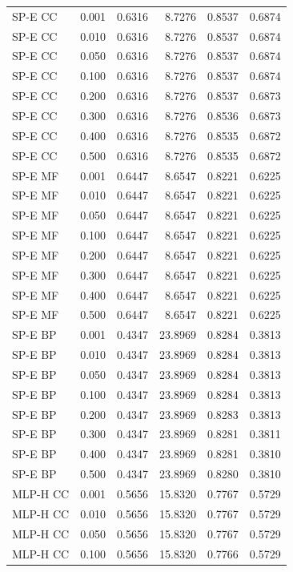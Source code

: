 \begin{longtable}{lrrrrr}
SP-E CC & 0.001 & 0.6316 & 8.7276 & 0.8537 & 0.6874 \\
SP-E CC & 0.010 & 0.6316 & 8.7276 & 0.8537 & 0.6874 \\
SP-E CC & 0.050 & 0.6316 & 8.7276 & 0.8537 & 0.6874 \\
SP-E CC & 0.100 & 0.6316 & 8.7276 & 0.8537 & 0.6874 \\
SP-E CC & 0.200 & 0.6316 & 8.7276 & 0.8537 & 0.6873 \\
SP-E CC & 0.300 & 0.6316 & 8.7276 & 0.8536 & 0.6873 \\
SP-E CC & 0.400 & 0.6316 & 8.7276 & 0.8535 & 0.6872 \\
SP-E CC & 0.500 & 0.6316 & 8.7276 & 0.8535 & 0.6872 \\
SP-E MF & 0.001 & 0.6447 & 8.6547 & 0.8221 & 0.6225 \\
SP-E MF & 0.010 & 0.6447 & 8.6547 & 0.8221 & 0.6225 \\
SP-E MF & 0.050 & 0.6447 & 8.6547 & 0.8221 & 0.6225 \\
SP-E MF & 0.100 & 0.6447 & 8.6547 & 0.8221 & 0.6225 \\
SP-E MF & 0.200 & 0.6447 & 8.6547 & 0.8221 & 0.6225 \\
SP-E MF & 0.300 & 0.6447 & 8.6547 & 0.8221 & 0.6225 \\
SP-E MF & 0.400 & 0.6447 & 8.6547 & 0.8221 & 0.6225 \\
SP-E MF & 0.500 & 0.6447 & 8.6547 & 0.8221 & 0.6225 \\
SP-E BP & 0.001 & 0.4347 & 23.8969 & 0.8284 & 0.3813 \\
SP-E BP & 0.010 & 0.4347 & 23.8969 & 0.8284 & 0.3813 \\
SP-E BP & 0.050 & 0.4347 & 23.8969 & 0.8284 & 0.3813 \\
SP-E BP & 0.100 & 0.4347 & 23.8969 & 0.8284 & 0.3813 \\
SP-E BP & 0.200 & 0.4347 & 23.8969 & 0.8283 & 0.3813 \\
SP-E BP & 0.300 & 0.4347 & 23.8969 & 0.8281 & 0.3811 \\
SP-E BP & 0.400 & 0.4347 & 23.8969 & 0.8281 & 0.3810 \\
SP-E BP & 0.500 & 0.4347 & 23.8969 & 0.8280 & 0.3810 \\
MLP-H CC & 0.001 & 0.5656 & 15.8320 & 0.7767 & 0.5729 \\
MLP-H CC & 0.010 & 0.5656 & 15.8320 & 0.7767 & 0.5729 \\
MLP-H CC & 0.050 & 0.5656 & 15.8320 & 0.7767 & 0.5729 \\
MLP-H CC & 0.100 & 0.5656 & 15.8320 & 0.7766 & 0.5729 \\

\end{longtable}
